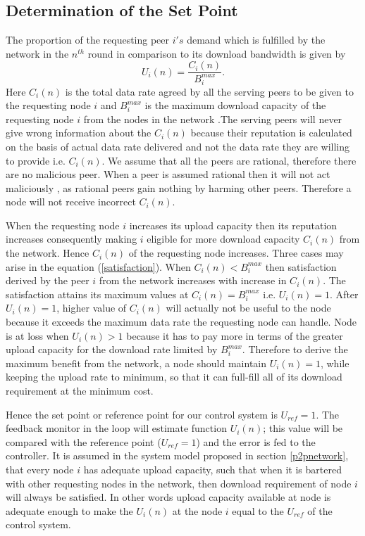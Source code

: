 \documentclass[journal]{IEEEtran}
\begin{document}
\subsection{Determination of the Set Point}
\label{SetPoint}
The proportion of the  requesting peer $i's$ demand which is fulfilled by the network in the $n^{th}$ round in comparison to its download bandwidth is given by 
\begin{equation}
	\label{satisfaction}
	{
		U_i(n)=\frac{C_i(n)}{B_i^{max}}.
	}
\end{equation}
Here $C_i(n)$  is the total data rate agreed by all the serving peers to be given to the requesting node $i$  and  $B_i^{max}$ is the maximum download capacity of the requesting node $i$ from the nodes in the network .The serving peers will never give wrong information about the $C_i(n)$ because their reputation is calculated on the basis of actual data rate delivered and not the data rate they are willing to provide i.e. $C_i(n)$. We assume that all the peers are rational, therefore there are no malicious peer. When a peer is assumed  rational then it will  not act maliciously \cite{RationalMalicious}, as rational peers gain nothing by harming other peers. Therefore a node will not receive incorrect $C_i(n)$.

When the requesting node $i$ increases its upload capacity then its reputation increases consequently making $i$ eligible for more download capacity $C_i(n)$ from the network. Hence $C_i(n)$ of the requesting node increases. Three cases may arise in the equation (\ref{satisfaction}). When $C_i(n)<B_i^{max}$ then satisfaction derived by the peer $i$ from the network increases with increase in $C_i(n)$. The satisfaction attains its maximum values at $C_i(n)=B_i^{max}$ i.e. $U_i(n)=1$. After $U_i(n)=1$, higher value of $C_i(n)$ will actually not be useful to the node because it exceeds the maximum data rate the requesting node can handle.  Node is at loss when $U_i(n)>1$ because it has to pay more in terms of the greater upload capacity for the download rate limited by $B_i^{max}$. Therefore to derive the maximum benefit from the network, a node should maintain $U_i(n)=1$, while keeping the upload rate to minimum, so that it can full-fill all of its download requirement at the minimum cost.

Hence the set point or reference point for our control system is $U_{ref}=1$. The feedback monitor in the loop will estimate function $U_i(n)$; this value will be compared with the reference point ($U_{ref}=1$) and the error is fed to the controller. It is assumed in the system model proposed in section \ref{p2pnetwork}, that every node $i$ has adequate upload capacity, such that when it is bartered with other requesting nodes in the network, then download requirement of  node $i$ will always be satisfied. In other words upload capacity available  at node  is adequate enough to make the $U_i(n)$ at the node $i$ equal to the $U_{ref}$ of the control system.
\end{document}
